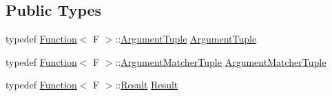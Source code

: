 \subsection*{Public Types}
\begin{DoxyCompactItemize}
\item 
typedef \hyperlink{structtesting_1_1internal_1_1_function}{Function}$<$ F $>$\+::\hyperlink{classtesting_1_1internal_1_1_typed_expectation_a9a91379262d101f435809ba4556d14fa}{Argument\+Tuple} \hyperlink{classtesting_1_1internal_1_1_typed_expectation_a9a91379262d101f435809ba4556d14fa}{Argument\+Tuple}
\item 
typedef \hyperlink{structtesting_1_1internal_1_1_function}{Function}$<$ F $>$\+::\hyperlink{classtesting_1_1internal_1_1_typed_expectation_a8f10e3906761cc5c10fa3561c6e8938e}{Argument\+Matcher\+Tuple} \hyperlink{classtesting_1_1internal_1_1_typed_expectation_a8f10e3906761cc5c10fa3561c6e8938e}{Argument\+Matcher\+Tuple}
\item 
typedef \hyperlink{structtesting_1_1internal_1_1_function}{Function}$<$ F $>$\+::\hyperlink{classtesting_1_1internal_1_1_typed_expectation_a6503597ee9d5ec940bfe8e51832b2422}{Result} \hyperlink{classtesting_1_1internal_1_1_typed_expectation_a6503597ee9d5ec940bfe8e51832b2422}{Result}
\end{DoxyCompactItemize}
